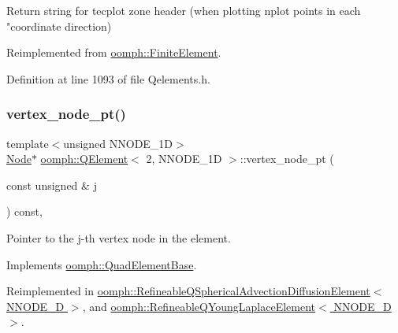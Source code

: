 Return string for tecplot zone header (when plotting nplot points in each "coordinate direction) 



Reimplemented from \hyperlink{classoomph_1_1FiniteElement_a3193df31f9ce38e0609d17a8ffb386c6}{oomph\+::\+Finite\+Element}.



Definition at line 1093 of file Qelements.\+h.

\mbox{\label{classoomph_1_1QElement_3_012_00_01NNODE__1D_01_4_a9d25598f1028fbd881dd5c57fea03d83}} 
\subsubsection{\texorpdfstring{vertex\+\_\+node\+\_\+pt()}{vertex\_node\_pt()}}
{\footnotesize\ttfamily template$<$unsigned N\+N\+O\+D\+E\+\_\+1D$>$ \\
\hyperlink{classoomph_1_1Node}{Node}$\ast$ \hyperlink{classoomph_1_1QElement}{oomph\+::\+Q\+Element}$<$ 2, N\+N\+O\+D\+E\+\_\+1D $>$\+::vertex\+\_\+node\+\_\+pt (\begin{DoxyParamCaption}\item[{const unsigned \&}]{j }\end{DoxyParamCaption}) const\hspace{0.3cm}{\ttfamily [inline]}, {\ttfamily [virtual]}}



Pointer to the j-\/th vertex node in the element. 



Implements \hyperlink{classoomph_1_1QuadElementBase_a4873d97a8792ddbf951062c1d0069da7}{oomph\+::\+Quad\+Element\+Base}.



Reimplemented in \hyperlink{classoomph_1_1RefineableQSphericalAdvectionDiffusionElement_af835676dba7c709266afe91006465b97}{oomph\+::\+Refineable\+Q\+Spherical\+Advection\+Diffusion\+Element$<$ N\+N\+O\+D\+E\+\_\+D $>$}, and \hyperlink{classoomph_1_1RefineableQYoungLaplaceElement_ad13e8cb5cdf4ddf4451f6c0ec06d56fe}{oomph\+::\+Refineable\+Q\+Young\+Laplace\+Element$<$ N\+N\+O\+D\+E\+\_\+D $>$}.



